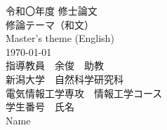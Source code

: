 \documentclass[12pt, a4j]{jreport}
\begin{document}
\thispagestyle{empty}

\begin{center}
\large{令和〇年度 修士論文}\\
\vspace{6cm}
\Large{修論テーマ（和文）}\\
\vspace{5mm}
\normalsize{Master's theme (English)}\\
\vspace{5cm}
\today
\\
\large{指導教員　余俊　助教}\\
\vspace{1cm}
\large{新潟大学　自然科学研究科\\電気情報工学専攻　情報工学コース}\\
\vspace{10mm}
\large{学生番号　氏名}\\
\large{Name}\\
\vspace{10mm}
\end{center}

\clearpage
\phantom{s}\thispagestyle{empty}
\clearpage

\pagestyle{empty}





\tableofcontents

















\newpage
{
%
%

\footnotesize
\addtolength{\itemsep}{-1em}
\clearpage
{}

}
\end{document}
